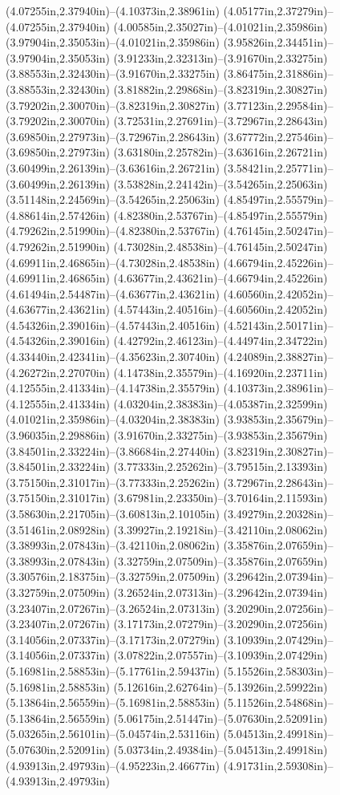(4.07255in,2.37940in)--(4.10373in,2.38961in) (4.05177in,2.37279in)--(4.07255in,2.37940in) (4.00585in,2.35027in)--(4.01021in,2.35986in) (3.97904in,2.35053in)--(4.01021in,2.35986in) (3.95826in,2.34451in)--(3.97904in,2.35053in) (3.91233in,2.32313in)--(3.91670in,2.33275in) (3.88553in,2.32430in)--(3.91670in,2.33275in) (3.86475in,2.31886in)--(3.88553in,2.32430in) (3.81882in,2.29868in)--(3.82319in,2.30827in) (3.79202in,2.30070in)--(3.82319in,2.30827in) (3.77123in,2.29584in)--(3.79202in,2.30070in) (3.72531in,2.27691in)--(3.72967in,2.28643in) (3.69850in,2.27973in)--(3.72967in,2.28643in) (3.67772in,2.27546in)--(3.69850in,2.27973in) (3.63180in,2.25782in)--(3.63616in,2.26721in) (3.60499in,2.26139in)--(3.63616in,2.26721in) (3.58421in,2.25771in)--(3.60499in,2.26139in) (3.53828in,2.24142in)--(3.54265in,2.25063in) (3.51148in,2.24569in)--(3.54265in,2.25063in) (4.85497in,2.55579in)--(4.88614in,2.57426in) (4.82380in,2.53767in)--(4.85497in,2.55579in) (4.79262in,2.51990in)--(4.82380in,2.53767in) (4.76145in,2.50247in)--(4.79262in,2.51990in) (4.73028in,2.48538in)--(4.76145in,2.50247in) (4.69911in,2.46865in)--(4.73028in,2.48538in) (4.66794in,2.45226in)--(4.69911in,2.46865in) (4.63677in,2.43621in)--(4.66794in,2.45226in) (4.61494in,2.54487in)--(4.63677in,2.43621in) (4.60560in,2.42052in)--(4.63677in,2.43621in) (4.57443in,2.40516in)--(4.60560in,2.42052in) (4.54326in,2.39016in)--(4.57443in,2.40516in) (4.52143in,2.50171in)--(4.54326in,2.39016in) (4.42792in,2.46123in)--(4.44974in,2.34722in) (4.33440in,2.42341in)--(4.35623in,2.30740in) (4.24089in,2.38827in)--(4.26272in,2.27070in) (4.14738in,2.35579in)--(4.16920in,2.23711in) (4.12555in,2.41334in)--(4.14738in,2.35579in) (4.10373in,2.38961in)--(4.12555in,2.41334in) (4.03204in,2.38383in)--(4.05387in,2.32599in) (4.01021in,2.35986in)--(4.03204in,2.38383in) (3.93853in,2.35679in)--(3.96035in,2.29886in) (3.91670in,2.33275in)--(3.93853in,2.35679in) (3.84501in,2.33224in)--(3.86684in,2.27440in) (3.82319in,2.30827in)--(3.84501in,2.33224in) (3.77333in,2.25262in)--(3.79515in,2.13393in) (3.75150in,2.31017in)--(3.77333in,2.25262in) (3.72967in,2.28643in)--(3.75150in,2.31017in) (3.67981in,2.23350in)--(3.70164in,2.11593in) (3.58630in,2.21705in)--(3.60813in,2.10105in) (3.49279in,2.20328in)--(3.51461in,2.08928in) (3.39927in,2.19218in)--(3.42110in,2.08062in) (3.38993in,2.07843in)--(3.42110in,2.08062in) (3.35876in,2.07659in)--(3.38993in,2.07843in) (3.32759in,2.07509in)--(3.35876in,2.07659in) (3.30576in,2.18375in)--(3.32759in,2.07509in) (3.29642in,2.07394in)--(3.32759in,2.07509in) (3.26524in,2.07313in)--(3.29642in,2.07394in) (3.23407in,2.07267in)--(3.26524in,2.07313in) (3.20290in,2.07256in)--(3.23407in,2.07267in) (3.17173in,2.07279in)--(3.20290in,2.07256in) (3.14056in,2.07337in)--(3.17173in,2.07279in) (3.10939in,2.07429in)--(3.14056in,2.07337in) (3.07822in,2.07557in)--(3.10939in,2.07429in) (5.16981in,2.58853in)--(5.17761in,2.59437in) (5.15526in,2.58303in)--(5.16981in,2.58853in) (5.12616in,2.62764in)--(5.13926in,2.59922in) (5.13864in,2.56559in)--(5.16981in,2.58853in) (5.11526in,2.54868in)--(5.13864in,2.56559in) (5.06175in,2.51447in)--(5.07630in,2.52091in) (5.03265in,2.56101in)--(5.04574in,2.53116in) (5.04513in,2.49918in)--(5.07630in,2.52091in) (5.03734in,2.49384in)--(5.04513in,2.49918in) (4.93913in,2.49793in)--(4.95223in,2.46677in) (4.91731in,2.59308in)--(4.93913in,2.49793in) 